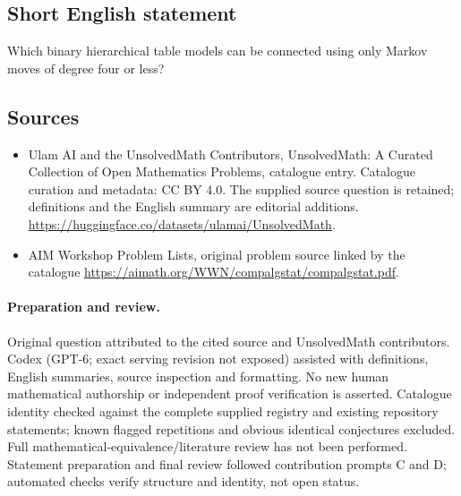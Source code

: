 \documentclass[11pt]{article}
\begin{document}
\subsection{Short English statement}
Which binary hierarchical table models can be connected using only Markov moves of degree four or less?
\subsection{Sources}
\begin{itemize}
\item[\hypertarget{source:statement:1}{S1}] Ulam AI and the UnsolvedMath Contributors, UnsolvedMath: A Curated Collection of Open Mathematics Problems, catalogue entry. Catalogue curation and metadata: CC BY 4.0. The supplied source question is retained; definitions and the English summary are editorial additions.
\url{https://huggingface.co/datasets/ulamai/UnsolvedMath}.
\item[\hypertarget{source:statement:2}{S2}] AIM Workshop Problem Lists, original problem source linked by the catalogue
\url{https://aimath.org/WWN/compalgstat/compalgstat.pdf}.
\end{itemize}
\paragraph{Preparation and review.}
Original question attributed to the cited source and UnsolvedMath contributors. Codex (GPT-6; exact serving revision not exposed) assisted with definitions, English summaries, source inspection and formatting. No new human mathematical authorship or independent proof verification is asserted. Catalogue identity checked against the complete supplied registry and existing repository statements; known flagged repetitions and obvious identical conjectures excluded. Full mathematical-equivalence/literature review has not been performed. Statement preparation and final review followed contribution prompts C and D; automated checks verify structure and identity, not open status.
\label{end:statement}
\end{document}
